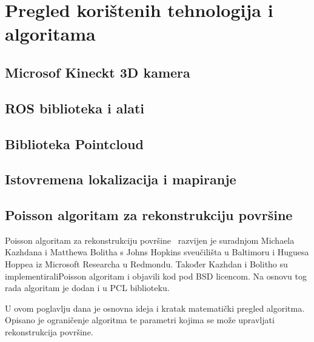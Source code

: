 \newpage
\setcounter{figure}{0}

\section{Pregled korištenih tehnologija i algoritama} %
\label{sec:Tehnologija i teorija}


\subsection{Microsof Kineckt 3D kamera} %
\label{sub:Microsof Kineckt 3D kamera}


\subsection{ROS biblioteka i alati} %
\label{sub:ROS biblioteka i alati}


\subsection{Biblioteka Pointcloud} %
\label{sub:Biblioteka Pointcloud}



\subsection{Istovremena lokalizacija i mapiranje} %
\label{sub:Slam}


\newpage
\subsection{Poisson algoritam za rekonstrukciju površine} %
\label{sub:Poisson}
Poisson algoritam za rekonstrukciju
površine~\cite{Kazhdan:2006:PSR:1281957.1281965} razvijen je suradnjom
Michaela Kazhdana i Matthewa Bolitha s Johns Hopkins sveučilišta u
Baltimoru i Huguesa Hoppea iz Microsoft Researcha u Redmondu. Također
Kazhdan i Bolitho su implementirali\footnotemark[1] Poisson algoritam i
objavili kod pod BSD licencom. Na osnovu tog rada algoritam je dodan i u
PCL biblioteku.

U ovom poglavlju dana je osnovna ideja i kratak matematički pregled
algoritma. Opisano je ograničenje algoritma te parametri kojima se može
upravljati rekonstrukcija površine.

